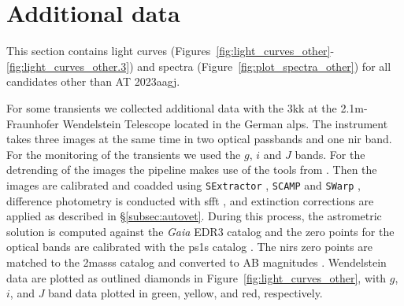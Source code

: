 \documentclass[twocolumn]{aastex631}
\begin{document}
% 

\appendix

\section{Additional data}
\label{app:additonaldata}

This section contains light curves (Figures~\ref{fig:light_curves_other}-\ref{fig:light_curves_other.3}) and spectra (Figure~\ref{fig:plot_spectra_other}) for all candidates other than AT 2023aagj.

For some transients we collected additional data with the \gls{3kk} \citep{2016SPIE.9908E..44L} at the 2.1m-Fraunhofer Wendelstein Telescope \citep{2014SPIE.9145E..2DH} located in the German alps.
The instrument takes three images at the same time in two optical passbands and one \gls{nir} band.
For the monitoring of the transients we used the $g$, $i$ and $J$ bands.
For the detrending of the images the pipeline makes use of the tools from \cite{2002A&A...381.1095G}.
Then the images are calibrated and coadded using \texttt{SExtractor} \citep{1996A&AS..117..393B}, \texttt{SCAMP} \citep{2006ASPC..351..112B} and \texttt{SWarp} \citep{2002ASPC..281..228B}, difference photometry is conducted with \gls{sfft} \citep{huImageSubtractionFourier2022}, and extinction corrections are applied as described in \S\ref{subsec:autovet}.
During this process, the astrometric solution is computed against the \textit{Gaia} EDR3 catalog \citep{gaiacollaborationGaiaMission2016, 2021A&A...649A...1G} and the zero points for the optical bands are calibrated with the \glspl{ps1} catalog \citep{2013ApJS..205...20M}.
The \glspl{nir} zero points are matched to the \glspl{2mass} catalog \citep{2006AJ....131.1163S} and converted to AB magnitudes \citep{2007AJ....133..734B}.
Wendelstein data are plotted as outlined diamonds in Figure~\ref{fig:light_curves_other}, with $g$, $i$, and $J$ band data plotted in green, yellow, and red, respectively.







\end{document}
